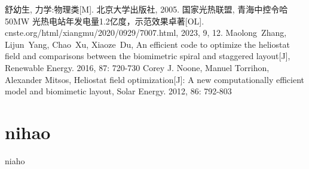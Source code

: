 \newpage

\begin{thebibliography}{9}
舒幼生, 力学:物理类[M]. 北京大学出版社, 2005.
国家光热联盟, 青海中控令哈 50MW 光热电站年发电量1.2亿度，示范效果卓著[OL]. cnste.org/html/xiangmu/2020/0929/7007.html, 2023, 9, 12.
Maolong~Zhang, Lijun~Yang, Chao~Xu, Xiaoze~Du, An efficient code to optimize the heliostat field and comparisons between the biomimetric spiral and staggered layout[J], Renewable Energy. 2016, 87: 720-730
Corey J. Noone, Manuel Torrihon, Alexander Mitsos, Heliostat field optimization[J]: A new computationally efficient model and biomimetic layout, Solar Energy. 2012, 86: 792-803
\end{thebibliography}

\appendix
\section{nihao}
niaho
